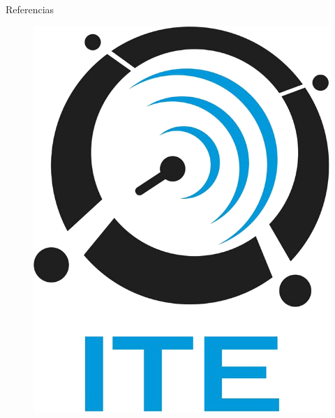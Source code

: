 \documentclass{beamer}
\begin{document}
\begin{frame}[fragile]{}
\begin{columns}[t]
\begin{column}{0.96\linewidth}
\begin{block}{Referencias}
\begin{minipage}[t]{0.71\textwidth}
\begin{small}
\begin{thebibliography}{widestlabel}
        \end{thebibliography}
        \end{small}
        \end{minipage}
        \hfill
           \begin{minipage}[t]{0.25\textwidth}
           	\vspace{0pt}
           	\begin{center}
           		\begin{figure}
           			\includegraphics[scale=0.2]{../graphics/ite.png} 
           		\end{figure}
           	\end{center}
           \end{minipage}
      \end{block}
   \end{column}
\end{columns}

\end{frame}
\end{document}
